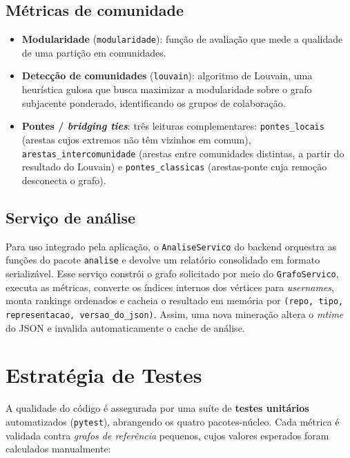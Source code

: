\documentclass[12pt]{article}
\begin{document}
\subsection{Métricas de comunidade}

\begin{itemize}
  \item \textbf{Modularidade} (\texttt{modularidade}): função de avaliação que
        mede a qualidade de uma partição em comunidades.
  \item \textbf{Detecção de comunidades} (\texttt{louvain}): algoritmo de Louvain,
        uma heurística gulosa que busca maximizar a
        modularidade sobre o grafo subjacente ponderado, identificando os grupos
        de colaboração.
  \item \textbf{Pontes / \emph{bridging ties}}: três leituras complementares:
        \texttt{pontes\_locais} (arestas cujos extremos não têm vizinhos em
        comum), \texttt{arestas\_intercomunidade} (arestas entre comunidades
        distintas, a partir do resultado do Louvain) e \texttt{pontes\_classicas}
        (arestas-ponte cuja remoção desconecta o grafo).
\end{itemize}

\subsection{Serviço de análise}

Para uso integrado pela aplicação, o \texttt{AnaliseServico} do backend orquestra
as funções do pacote \texttt{analise} e devolve um relatório consolidado em
formato serializável. Esse serviço constrói o grafo solicitado por meio do
\texttt{GrafoServico}, executa as métricas, converte os índices internos dos
vértices para \emph{usernames}, monta rankings ordenados e cacheia o resultado em
memória por \texttt{(repo, tipo, representacao, versao\_do\_json)}. Assim, uma
nova mineração altera o \emph{mtime} do JSON e invalida automaticamente o cache
de análise.

\section{Estratégia de Testes}
\label{sec:testes}

A qualidade do código é assegurada por uma suíte de \textbf{testes unitários}
automatizados (\texttt{pytest}), abrangendo os quatro pacotes-núcleo. Cada
métrica é validada contra \emph{grafos de referência} pequenos, cujos valores
esperados foram calculados manualmente:
\end{document}
